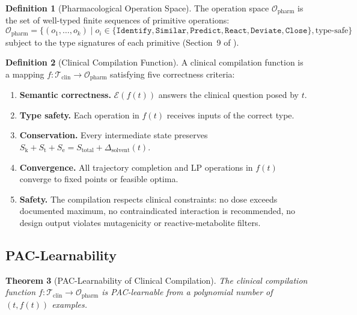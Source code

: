 \documentclass[11pt,twocolumn,a4paper]{article}
\newtheorem{theorem}{Theorem}[section]
\theoremstyle{definition}
\newtheorem{definition}[theorem]{Definition}
\theoremstyle{remark}
\newcommand{\Sk}{S_{\mathrm{k}}}
\newcommand{\St}{S_{\mathrm{t}}}
\newcommand{\Se}{S_{\mathrm{e}}}
\newcommand{\taskspace}{\mathcal{T}}
\newcommand{\opspace}{\mathcal{O}}
\newcommand{\engine}{\mathcal{E}}
\begin{document}
\begin{definition}[Pharmacological Operation Space]
\label{def:op_space}
The operation space $\opspace_{\mathrm{pharm}}$ is the set of well-typed finite sequences of primitive operations:
\begin{equation}
\opspace_{\mathrm{pharm}} = \{(o_1, \ldots, o_k) \mid o_i \in \{\texttt{Identify}, \texttt{Similar}, \texttt{Predict}, \texttt{React}, \texttt{Deviate}, \texttt{Close}\}, \text{type-safe}\}
\end{equation}
subject to the type signatures of each primitive (Section~9 of \citep{sachikonye2025e}).
\end{definition}

\begin{definition}[Clinical Compilation Function]
\label{def:compilation}
A clinical compilation function is a mapping $f: \taskspace_{\mathrm{clin}} \to \opspace_{\mathrm{pharm}}$ satisfying five correctness criteria:
\begin{enumerate}[nosep,leftmargin=*]
\item \textbf{Semantic correctness.} $\engine(f(t))$ answers the clinical question posed by $t$.
\item \textbf{Type safety.} Each operation in $f(t)$ receives inputs of the correct type.
\item \textbf{Conservation.} Every intermediate state preserves $\Sk + \St + \Se = S_{\mathrm{total}} + \Delta_{\mathrm{solvent}}(t)$.
\item \textbf{Convergence.} All trajectory completion and LP operations in $f(t)$ converge to fixed points or feasible optima.
\item \textbf{Safety.} The compilation respects clinical constraints: no dose exceeds documented maximum, no contraindicated interaction is recommended, no design output violates mutagenicity or reactive-metabolite filters.
\end{enumerate}
\end{definition}

\subsection{PAC-Learnability}

\begin{theorem}[PAC-Learnability of Clinical Compilation]
\label{thm:pac_learnable}
The clinical compilation function $f: \taskspace_{\mathrm{clin}} \to \opspace_{\mathrm{pharm}}$ is PAC-learnable from a polynomial number of $(t, f(t))$ examples.
\end{theorem}
\end{document}
